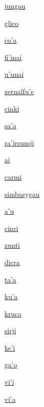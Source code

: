 {\hyperlink{val:jungau}{jungau}}{}{}{}

{\hyperlink{val:glico}{glico}}{}{}{}

{\hyperlink{val:coha}{co'a}}{}{}{}

{\hyperlink{val:fihinai}{fi'inai}}{}{}{}

{\hyperlink{val:uhunai}{u'unai}}{}{}{}

{\hyperlink{val:zernalfuhe}{zernalfu'e}}{}{}{}

{\hyperlink{val:cinki}{cinki}}{}{}{}

{\hyperlink{val:saha}{sa'a}}{}{}{}

{\hyperlink{val:rahirsumji}{ra'irsumji}}{}{}{}

{\hyperlink{val:ai}{ai}}{}{}{}

{\hyperlink{val:carmi}{carmi}}{}{}{}

{\hyperlink{val:simbasygau}{simbasygau}}{}{}{}

{\hyperlink{val:ahu}{a'u}}{}{}{}

{\hyperlink{val:cinri}{cinri}}{}{}{}

{\hyperlink{val:zunti}{zunti}}{}{}{}

{\hyperlink{val:dicra}{dicra}}{}{}{}

{\hyperlink{val:taha}{ta'a}}{}{}{}

{\hyperlink{val:kuha}{ku'a}}{}{}{}

{\hyperlink{val:kruca}{kruca}}{}{}{}

{\hyperlink{val:sirji}{sirji}}{}{}{}

{\hyperlink{val:kehi}{ke'i}}{}{}{}

{\hyperlink{val:gaho}{ga'o}}{}{}{}

{\hyperlink{val:vihi}{vi'i}}{}{}{}

{\hyperlink{val:viha}{vi'a}}{}{}{}

